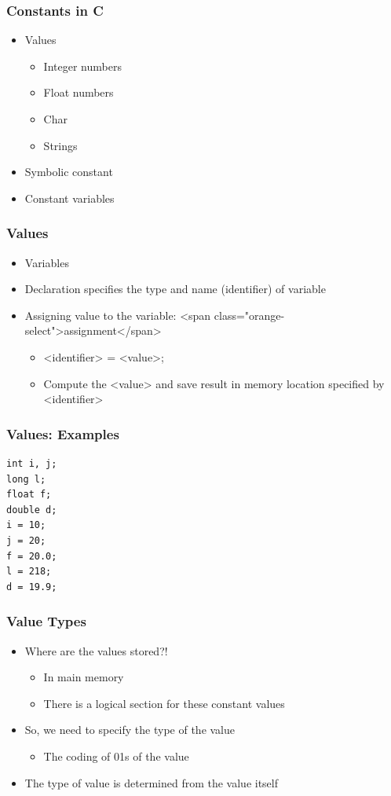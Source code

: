 \documentclass{../c-lecture}
\begin{document}
\begin{frame}
  \frametitle{Constants in C}
  \begin{itemize}
    \item Values
    \begin{itemize}
      \item Integer numbers
      \item Float numbers
      \item Char
      \item Strings
    \end{itemize}
    \item Symbolic constant
    \item Constant variables
  \end{itemize}
\end{frame}

\begin{frame}
  \frametitle{Values}
  \begin{itemize}
    \item Variables
    \item Declaration specifies the type and name (identifier) of variable
    \item
      Assigning value to the variable:
      <span class="orange-select">assignment</span>

    \begin{itemize}
      \item <identifier> = <value>;
      \item
        Compute the <value> and save result in memory location specified
        by <identifier>

    \end{itemize}
  \end{itemize}
\end{frame}

\begin{frame}
  \frametitle{Values: Examples}
  \begin{verbatim}
int i, j;
long l;
float f;
double d;
i = 10;
j = 20;
f = 20.0;
l = 218;
d = 19.9;
  \end{verbatim}
\end{frame}

\begin{frame}
  \frametitle{Value Types}
  \begin{itemize}
    \item Where are the values stored?!
    \begin{itemize}
      \item In main memory
      \item There is a logical section for these constant values
    \end{itemize}
    \item So, we need to specify the type of the value
    \begin{itemize}
      \item The coding of 01s of the value
    \end{itemize}
    \item The type of value is determined from the value itself
  \end{itemize}
\end{frame}
\end{document}
